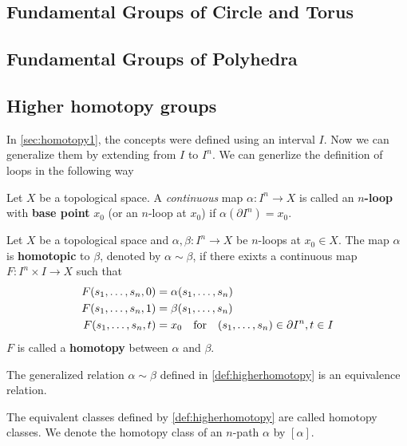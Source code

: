 \documentclass[10pt]{article}
\begin{document}
\subsection{Fundamental Groups of Circle and Torus}

\subsection{Fundamental Groups of Polyhedra}
\subsection{Higher homotopy groups}
In \cref{sec:homotopy1}, the concepts were defined using an interval $I$. 
Now we can generalize them by extending from $I$ to $I^n$.
We can generlize the definition of loops in the following way
\begin{definition}[n-Path]
    Let $X$ be a topological space.
    A \textit{continuous} map $\alpha:I^n\to X$ is called an \textbf{$n$-loop} with \textbf{base point} $x_0$ (or an $n$-loop at $x_0$) if $\alpha(\partial I^n)=x_0$.
\end{definition}

\begin{definition}
    Let $X$ be a topological space and $\alpha,\beta:I^n\to X$ be $n$-loops at $x_0\in X$.
    The map $\alpha$ is \textbf{homotopic} to $\beta$, denoted by $\alpha\sim\beta$, if there exixts a continuous map $F:I^n\times I\to X$ such that 
    \begin{subequations}
        \begin{align}
            F(s_1,\dots,s_n,0)&=\alpha(s_1,\dots,s_n)\\
            F(s_1,\dots,s_n,1)&=\beta(s_1,\dots,s_n)\\
            F(s_1,\dots,s_n,t)&=x_0\qfor(s_1,\dots,s_n)\in\partial I^n, t\in I
        \end{align}
    \end{subequations}
    $F$ is called a \textbf{homotopy} between $\alpha$ and $\beta$.
\end{definition}
\begin{proposition}
    The generalized relation $\alpha\sim\beta$ defined in \cref{def:higherhomotopy} is an equivalence relation.
\end{proposition}
The equivalent classes defined by \cref{def:higherhomotopy} are called homotopy classes.
We denote the homotopy class of an $n$-path $\alpha$ by $[\alpha]$.
\end{document}
